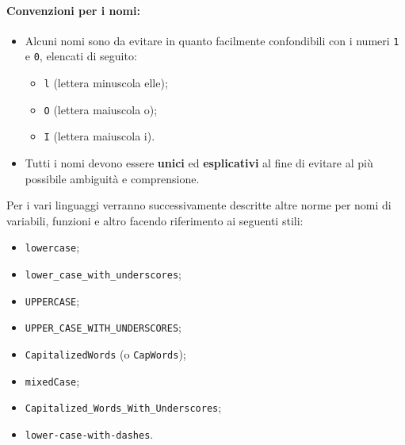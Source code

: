 \documentclass[NormeDiProgetto.tex]{subfiles}
\begin{document}
\paragraph*{Convenzioni per i nomi: }
\begin{itemize}
	\item Alcuni nomi sono da evitare in quanto facilmente confondibili con i numeri \texttt{1} e \texttt{0}, elencati di seguito:
	\begin{itemize}
		\item \texttt{l} (lettera minuscola elle);
		\item \texttt{O} (lettera maiuscola o);
		\item \texttt{I} (lettera maiuscola i).
	\end{itemize}
	\item Tutti i nomi devono essere \textbf{unici} ed \textbf{esplicativi} al fine di evitare al più possibile ambiguità e comprensione.
\end{itemize}
Per i vari linguaggi verranno successivamente descritte altre norme per nomi di variabili, funzioni e altro facendo riferimento ai seguenti stili:
\begin{itemize}
	\item \texttt{lowercase};
	\item \texttt{lower\_case\_with\_underscores};
	\item \texttt{UPPERCASE};
	\item \texttt{UPPER\_CASE\_WITH\_UNDERSCORES};
	\item \texttt{CapitalizedWords} (o \texttt{CapWords});
	\item \texttt{mixedCase};
	\item \texttt{Capitalized\_Words\_With\_Underscores};
	\item \texttt{lower-case-with-dashes}.
\end{itemize}
\end{document}
